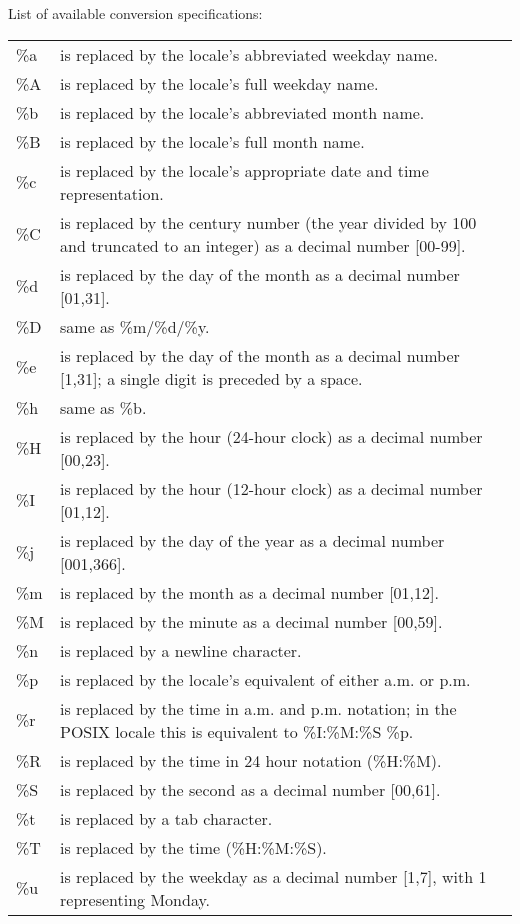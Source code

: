 \bigskip 
\noindent List of available conversion specifications:
\begin{center}
\begin{tabularx}{\linewidth}{lX}
\%a & is replaced by the locale's abbreviated weekday name. \\
\%A & is replaced by the locale's full weekday name. \\
\%b & is replaced by the locale's abbreviated month name. \\
\%B & is replaced by the locale's full month name. \\
\%c & is replaced by the locale's appropriate date and time representation. \\
\%C & is replaced by the century number (the year divided by 100 and truncated to an integer) as a decimal number [00-99]. \\
\%d & is replaced by the day of the month as a decimal number [01,31]. \\
\%D & same as \%m/\%d/\%y. \\
\%e & is replaced by the day of the month as a decimal number [1,31]; a single digit is preceded by a space. \\
\%h & same as \%b. \\
\%H & is replaced by the hour (24-hour clock) as a decimal number [00,23]. \\
\%I & is replaced by the hour (12-hour clock) as a decimal number [01,12]. \\
\%j & is replaced by the day of the year as a decimal number [001,366]. \\
\%m & is replaced by the month as a decimal number [01,12]. \\
\%M & is replaced by the minute as a decimal number [00,59]. \\
\%n & is replaced by a newline character. \\
\%p & is replaced by the locale's equivalent of either a.m. or p.m. \\
\%r & is replaced by the time in a.m. and p.m. notation; in the POSIX locale this is equivalent to \%I:\%M:\%S \%p. \\
\%R & is replaced by the time in 24 hour notation (\%H:\%M). \\
\%S & is replaced by the second as a decimal number [00,61]. \\
\%t & is replaced by a tab character. \\
\%T & is replaced by the time (\%H:\%M:\%S). \\
\%u & is replaced by the weekday as a decimal number [1,7], with 1 representing Monday. \\

\end{tabularx}
\end{center}

